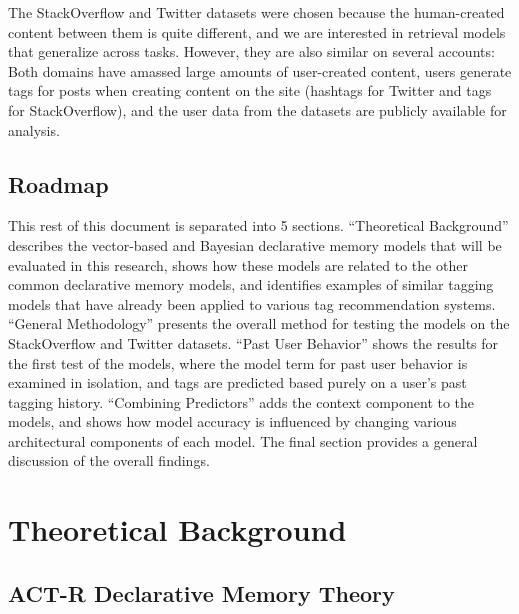 \documentclass[man,floatsintext,donotrepeattitle]{apa6}
\begin{document}
The StackOverflow and Twitter datasets were chosen because the human-created content between them is quite different, and we are interested in retrieval models that generalize across tasks.
However, they are also similar on several accounts:
Both domains have amassed large amounts of user-created content, users generate tags for posts when creating content on the site (hashtags for Twitter and tags for StackOverflow),
and the user data from the datasets are publicly available for analysis.

\subsection{Roadmap}

This rest of this document is separated into 5 sections.
``Theoretical Background'' describes the vector-based and Bayesian declarative memory models that will be evaluated in this research,
shows how these models are related to the other common declarative memory models,
and identifies examples of similar tagging models that have already been applied to various tag recommendation systems.
``General Methodology'' presents the overall method for testing the models on the StackOverflow and Twitter datasets.
``Past User Behavior'' shows the results for the first test of the models, where the model term for past user behavior is examined in isolation, and tags are predicted based purely on a user's past tagging history.
``Combining Predictors'' adds the context component to the models, and shows how model accuracy is influenced by changing various architectural components of each model.
The final section provides a general discussion of the overall findings.

\section{Theoretical Background}

\subsection{ACT-R Declarative Memory Theory}
\end{document}
